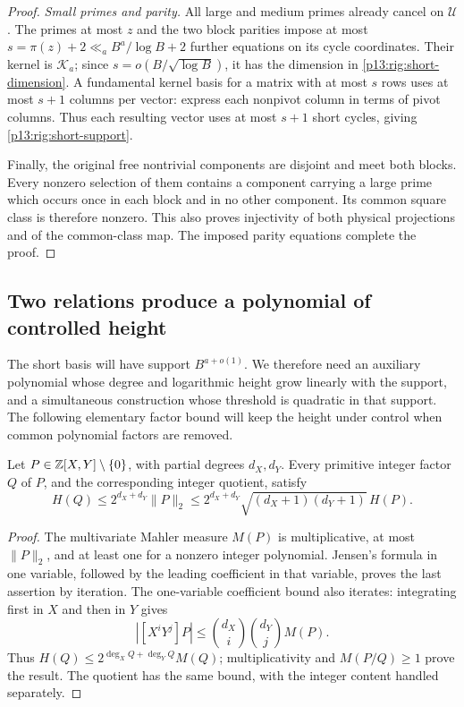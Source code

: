 \begin{proof}
\emph{Small primes and parity.}
All large and medium primes already cancel on $\mathcal U$.
The primes at most $z$ and the two block parities impose at
most $s=\pi(z)+2\ll_a B^a/\log B+2$ further equations on its
cycle coordinates.  Their kernel is $\mathcal K_a$; since
$s=o(B/\sqrt{\log B})$, it has the dimension in
\eqref{p13:rig:short-dimension}.  A fundamental kernel basis
for a matrix with at most $s$ rows uses at most $s+1$ columns
per vector: express each nonpivot column in terms of pivot
columns.  Thus each resulting vector uses at most $s+1$
short cycles, giving \eqref{p13:rig:short-support}.

Finally, the original free nontrivial components are disjoint
and meet both blocks.  Every nonzero selection of them contains
a component carrying a large prime which occurs once in each
block and in no other component.  Its common square class is
therefore nonzero.  This also proves injectivity of both physical
projections and of the common-class map.  The imposed parity
equations complete the proof.
\end{proof}

\subsection{Two relations produce a polynomial of controlled height}

The short basis will have support $B^{a+o(1)}$.  We therefore
need an auxiliary polynomial whose degree and logarithmic
height grow linearly with the support, and a simultaneous
construction whose threshold is quadratic in that support.
The following elementary factor bound will keep the height
under control when common polynomial factors are removed.

\begin{lemma}
\label{p13:rig:factor-height}
Let $P\in\mathbb Z[X,Y]\setminus\{0\}$, with partial degrees
$d_X,d_Y$.  Every primitive integer factor $Q$ of $P$, and
the corresponding integer quotient, satisfy
\[
 H(Q)\le2^{d_X+d_Y}\|P\|_2
       \le2^{d_X+d_Y}\sqrt{(d_X+1)(d_Y+1)}\,H(P).
\]
\end{lemma}

\begin{proof}
The multivariate Mahler measure $M(P)$ is multiplicative,
at most $\|P\|_2$, and at least one for a nonzero integer
polynomial.  Jensen's formula in one variable, followed by
the leading coefficient in that variable, proves the last
assertion by iteration.  The one-variable coefficient bound
also iterates: integrating first in $X$ and then in $Y$ gives
\[
 |[X^iY^j]P|\le\binom{d_X}{i}\binom{d_Y}{j}M(P).
\]
Thus $H(Q)\le2^{\deg_XQ+\deg_YQ}M(Q)$; multiplicativity
and $M(P/Q)\ge1$ prove the result.  The quotient has the same
bound, with the integer content handled separately.
\end{proof}

